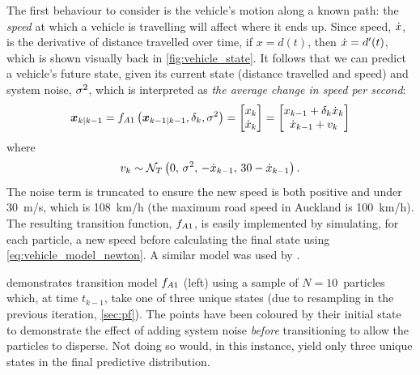 The first behaviour to consider is the vehicle's motion along a known path: the \emph{speed} at which a vehicle is travelling will affect where it ends up. Since speed, $\dot x$, is the derivative of distance travelled over time, if $x = d(t)$, then $\dot x = d'(t)$, which is shown visually back in \cref{fig:vehicle_state}. It follows that we can predict a vehicle's future state, given its current state (distance travelled and speed) and system noise, $\sigma^2$, which is interpreted as \emph{the average change in speed per second}:
\begin{equation}
\label{eq:vehicle_model_newton}
\boldsymbol x_{k|k-1} = f_{A1}\left(\boldsymbol x_{k-1|k-1}, \delta_k, \sigma^2\right) =
\begin{bmatrix}
x_k \\ \dot x_k
\end{bmatrix} =
\begin{bmatrix}
x_{k-1} + \delta_k\dot x_k \\
\dot x_{k-1} + v_k
\end{bmatrix}
\end{equation}
where
\begin{equation}\label{eq:vehicle_model_newton_noise}
v_k \sim \mathcal{N}_T\left(0,\, \sigma^2,\, -\dot x_{k-1},\, 30 - \dot x_{k-1}\right).
\end{equation}
The noise term is truncated to ensure the new speed is both positive and under 30~m/s, which is 108~km/h (the maximum road speed in Auckland is 100~km/h). The resulting transition function, $f_{A1}$, is easily implemented by simulating, for each particle, a new speed before calculating the final state using \cref{eq:vehicle_model_newton}. A similar model was used by \citet{Cathey_2003,Dailey_2001}.


 demonstrates transition model $f_{A1}$ (left) using a sample of $N=10$~particles which, at time $t_{k-1}$, take one of three unique states (due to resampling in the previous iteration, \cref{sec:pf}). The points have been coloured by their initial state to demonstrate the effect of adding system noise \emph{before} transitioning to allow the particles to disperse. Not doing so would, in this instance, yield only three unique states in the final predictive distribution.

